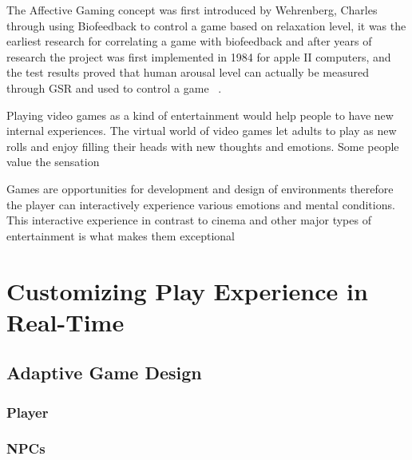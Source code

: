 \documentclass{uofsthesis-cs}
\begin{document}

The Affective Gaming concept was first introduced by Wehrenberg, Charles through using Biofeedback to control a game based on relaxation level, it was the earliest research for correlating a game with biofeedback and after years of research the project was first implemented in 1984 for apple II computers, and the test results proved that human arousal level can actually be measured through GSR and used to control a game  ~\cite{wehrenberg1995willball}.


Playing video games as a kind of entertainment would help people to have new internal
experiences. The virtual world of video games let adults to play as new rolls and enjoy filling
their heads with new thoughts and emotions. Some people value
the sensation

Games are opportunities for development and design of environments therefore
the player can interactively experience various emotions and mental conditions.
This interactive experience in contrast to cinema
and other major types of entertainment is what makes them exceptional



\chapter{Customizing Play Experience in Real-Time}
\label{chap:custmz}


\section{Adaptive Game Design}
\subsection{Player}
\subsection{NPCs}
\end{document}
